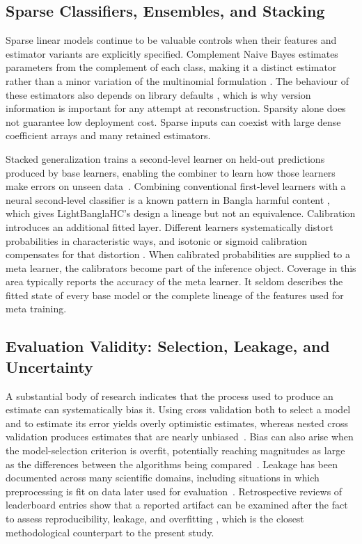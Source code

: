 \documentclass[runningheads]{llncs}
\begin{document}
\subsection{Sparse Classifiers, Ensembles, and Stacking}
\label{sec:rw-stacking}

Sparse linear models continue to be valuable controls when their features and estimator variants are explicitly specified. Complement Naive Bayes estimates parameters from the complement of each class, making it a distinct estimator rather than a minor variation of the multinomial formulation . The behaviour of these estimators also depends on library defaults , which is why version information is important for any attempt at reconstruction. Sparsity alone does not guarantee low deployment cost. Sparse inputs can coexist with large dense coefficient arrays and many retained estimators.

Stacked generalization trains a second-level learner on held-out predictions produced by base learners, enabling the combiner to learn how those learners make errors on unseen data~\cite{wolpert1992stacked}. Combining conventional first-level learners with a neural second-level classifier is a known pattern in Bangla harmful content , which gives LightBanglaHC’s design a lineage but not an equivalence. Calibration introduces an additional fitted layer. Different learners systematically distort probabilities in characteristic ways, and isotonic or sigmoid calibration compensates for that distortion . When calibrated probabilities are supplied to a meta learner, the calibrators become part of the inference object. Coverage in this area typically reports the accuracy of the meta learner. It seldom describes the fitted state of every base model or the complete lineage of the features used for meta training.

\subsection{Evaluation Validity: Selection, Leakage, and Uncertainty}
\label{sec:rw-eval}

A substantial body of research indicates that the process used to produce an estimate can systematically bias it. Using cross validation both to select a model and to estimate its error yields overly optimistic estimates, whereas nested cross validation produces estimates that are nearly unbiased~\cite{varma2006bias}. Bias can also arise when the model-selection criterion is overfit, potentially reaching magnitudes as large as the differences between the algorithms being compared~\cite{cawley2010overfitting}. Leakage has been documented across many scientific domains, including situations in which preprocessing is fit on data later used for evaluation~\cite{kapoor2023leakage}. Retrospective reviews of leaderboard entries show that a reported artifact can be examined after the fact to assess reproducibility, leakage, and overfitting , which is the closest methodological counterpart to the present study.
\end{document}

